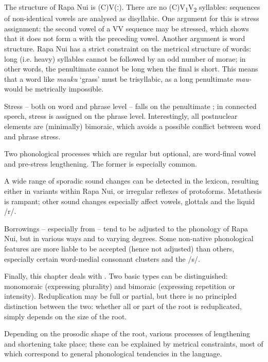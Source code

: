 The  structure of Rapa Nui is (C)V(ː). There are no (C)V\textsubscript{1}V\textsubscript{2} syllables: sequences of non-identical vowels are analysed as disyllabic. One argument for this is stress assignment: the second vowel of a VV sequence may be stressed, which shows that it does not form a  with the preceding vowel. Another argument is word structure. Rapa Nui has a strict constraint on the metrical structure of words: long (i.e. heavy) syllables cannot be followed by an odd number of morae; in other words, the penultimate  cannot be long when the final  is short. This means that a word like \textit{mauku} ‘grass’ must be trisyllabic, as a long penultimate  \textit{mau-} would be metrically impossible.

Stress – both on word and phrase level – falls on the penultimate ; in connected speech, stress is assigned on the phrase level. Interestingly, all postnuclear elements are (minimally) bimoraic, which avoids a possible conflict between word and phrase stress.

Two phonological processes which are regular but optional, are word-final vowel  and pre-stress lengthening. The former is especially common.

A wide range of sporadic sound changes can be detected in the lexicon, resulting either in variants within Rapa Nui, or irregular reflexes of protoforms. Metathesis is rampant; other sound changes especially affect vowels, glottals and the liquid /r/.

Borrowings – especially from  – tend to be adjusted to the phonology of Rapa Nui, but in various ways and to varying degrees. Some non-native phonological features are more liable to be accepted (hence not adjusted) than others, especially certain word-medial consonant clusters and the  /s/.

Finally, this chapter deals with . Two basic types can be distinguished: monomoraic (expressing plurality) and bimoraic (expressing repetition or intensity). Re\-du\-plication may be full or partial, but there is no principled distinction between the two: whether all or part of the root is reduplicated, simply depends on the size of the root.

Depending on the prosodic shape of the root, various processes of lengthening and shortening take place; these can be explained by metrical constraints, most of which correspond to general phonological tendencies in the language.

